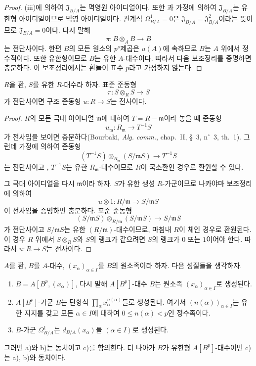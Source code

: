 \begin{proof}
(iii)에 의하여 $\mathfrak J_{B/A}$는 멱영원
아이디얼이다. 또한 과 가정에 의하여
$\mathfrak J_{B/A}$는 유한형 아이디얼이므로 멱영 아이디얼이다.
관계식 $\Omega^1_{B/A}=0$은
$\mathfrak J_{B/A}=\mathfrak J_{B/A}^2$이라는 뜻이므로
$\mathfrak J_{B/A}=0$이다. 다시 말해
\[
  \pi:B\otimes_A B\longrightarrow B
\]
는 전단사이다. 한편 $B$의 모든 원소의 $p^s$제곱은 $u(A)$에
속하므로 $B$는 $A$ 위에서 정수적이다. 또한 유한형이므로 $B$는 유한
$A$-대수이다. 따라서 다음 보조정리를 증명하면 충분하다. 이
보조정리에서는 환들이 표수 $p$라고 가정하지 않는다.
\end{proof}

\begin{lemma}[21.1.6.1]
\label{0.21.1.6.1-ko}
$R$을 환, $S$를 유한 $R$-대수라 하자. 표준 준동형
\[
  \pi:S\otimes_R S\longrightarrow S
\]
가 전단사이면 구조 준동형 $u:R\to S$는 전사이다.
\end{lemma}

\begin{proof}
$R$의 모든 극대 아이디얼 $\mathfrak m$에 대하여 $T=R-\mathfrak m$이라
놓을 때 준동형
\[
  u_{\mathfrak m}:R_{\mathfrak m}\longrightarrow T^{-1}S
\]
가 전사임을 보이면 충분하다(Bourbaki, \emph{Alg. comm.}, chap.~II,
§~3, n$^\circ$~3, th.~1). 그런데 가정에 의하여 준동형
\[
  (T^{-1}S)\otimes_{R_{\mathfrak m}}(S/\mathfrak mS)
  \longrightarrow T^{-1}S
\]
는 전단사이고 , $T^{-1}S$는 유한
$R_{\mathfrak m}$-대수이므로 $R$이 국소환인 경우로 환원할 수 있다.

그 극대 아이디얼을 다시 $\mathfrak m$이라 하자. $S$가 유한 생성
$R$-가군이므로 나카야마 보조정리에 의하여
\[
  u\otimes1:R/\mathfrak m\longrightarrow S/\mathfrak mS
\]
이 전사임을 증명하면 충분하다. 표준 준동형
\[
  (S/\mathfrak mS)\otimes_{R/\mathfrak m}(S/\mathfrak mS)
  \longrightarrow S/\mathfrak mS
\]
가 전단사이고 $S/\mathfrak mS$는 유한 $(R/\mathfrak m)$-대수이므로,
마침내 $R$이 체인 경우로 환원된다. 이 경우 $R$ 위에서
$S\otimes_R S$와 $S$의 랭크가 같으려면 $S$의 랭크가 $0$ 또는
$1$이어야 한다. 따라서 $u:R\to S$는 전사이다.
\end{proof}

\begin{proposition}[21.1.7]
\label{0.21.1.7-ko}
$A$를 환, $B$를 $A$-대수, $(x_\alpha)_{\alpha\in I}$를 $B$의
원소족이라 하자. 다음 성질들을 생각하자.
\begin{enumerate}
  \item[\rm a)] $B=A[B^p,(x_\alpha)]$, 다시 말해 $A[B^p]$-대수
  $B$는 원소족 $(x_\alpha)_{\alpha\in I}$로 생성된다.
  \item[\rm b)] $A[B^p]$-가군 $B$는 단항식
  $\prod_\alpha x_\alpha^{n(\alpha)}$들로 생성된다. 여기서
  $(n(\alpha))_{\alpha\in I}$는 유한 지지를 갖고 모든 $\alpha\in I$에
  대하여 $0\leq n(\alpha)<p$인 정수족이다.
  \item[\rm c)] $B$-가군 $\Omega^1_{B/A}$는
  $d_{B/A}(x_\alpha)$들 $(\alpha\in I)$로 생성된다.
\end{enumerate}
그러면 a)와 b)는 동치이고 c)를 함의한다. 더 나아가 $B$가 유한형
$A[B^p]$-대수이면 c)는 a), b)와 동치이다.
\end{proposition}

